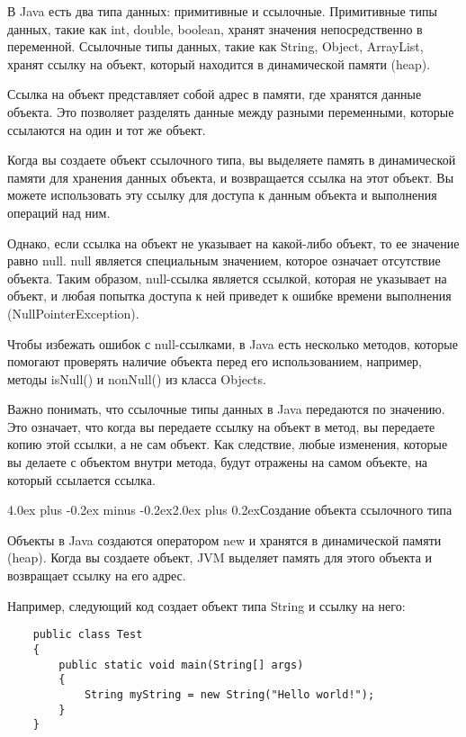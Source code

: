 \documentclass[12pt, a4paper]{book}%
\makeatletter
\renewcommand{\section}{\@startsection{section}{1}{1pt}%
{4.0ex plus -0.2ex minus -0.2ex}{2.0ex plus 0.2ex}{\centering\bf}}%
\makeatother
\begin{document}
{В Java есть два типа данных: примитивные и ссылочные. Примитивные типы данных, такие как int, double, boolean, хранят значения непосредственно в переменной. Ссылочные типы данных, такие как String, Object, ArrayList, хранят ссылку на объект, который находится в динамической памяти (heap).

Ссылка на объект представляет собой адрес в памяти, где хранятся данные объекта. Это позволяет разделять данные между разными переменными, которые ссылаются на один и тот же объект.

Когда вы создаете объект ссылочного типа, вы выделяете память в динамической памяти для хранения данных объекта, и возвращается ссылка на этот объект. Вы можете использовать эту ссылку для доступа к данным объекта и выполнения операций над ним.

Однако, если ссылка на объект не указывает на какой-либо объект, то ее значение равно null. null является специальным значением, которое означает отсутствие объекта. Таким образом, null-ссылка является ссылкой, которая не указывает на объект, и любая попытка доступа к ней приведет к ошибке времени выполнения (NullPointerException).

Чтобы избежать ошибок с null-ссылками, в Java есть несколько методов, которые помогают проверять наличие объекта перед его использованием, например, методы isNull() и nonNull() из класса Objects.

Важно понимать, что ссылочные типы данных в Java передаются по значению. Это означает, что когда вы передаете ссылку на объект в метод, вы передаете копию этой ссылки, а не сам объект. Как следствие, любые изменения, которые вы делаете с объектом внутри метода, будут отражены на самом объекте, на который ссылается ссылка.

\section{Создание объекта ссылочного типа}

Объекты в Java создаются оператором new и хранятся в динамической памяти (heap). Когда вы создаете объект, JVM выделяет память для этого объекта и возвращает ссылку на его адрес.

Например, следующий код создает объект типа String и ссылку на него:

\begin{lstlisting}
    public class Test
    {
        public static void main(String[] args)
        {
            String myString = new String("Hello world!");
        }
    }
\end{lstlisting}

}
\end{document}
